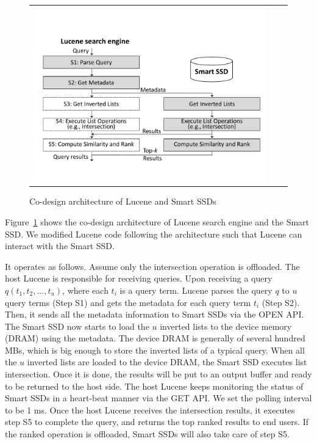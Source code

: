 \begin{figure}[htbp]
  \centering
  \begin{tabular}{ccc}
 \includegraphics[width=1.0\columnwidth]{figures/SmartSSDLucene.pdf}
\end{tabular}
  \caption{Co-design architecture of Lucene and Smart SSDs}
  \label{fig:SmartSSDLucene}
 \end{figure}

Figure~\ref{fig:SmartSSDLucene} shows the co-design architecture of Lucene search engine and the Smart SSD. We modified Lucene code following the architecture such that Lucene can interact with the Smart SSD.

It operates as follows. Assume only the \textsf{intersection} operation is offloaded. The host Lucene is responsible for receiving queries. Upon receiving a query $q(t_1,t_2,...,t_u)$, where each $t_i$ is a query term. Lucene parses the query $q$ to $u$ query terms (Step S1) and gets the metadata for each query term $t_i$ (Step S2). Then, it sends all the metadata information to Smart SSDs via the OPEN API.
The Smart SSD now starts to load the $u$ inverted lists to the device memory (DRAM) using the metadata. The device DRAM is generally of several hundred MBs, which is big enough to store the inverted lists of a typical query.
When all the $u$ inverted lists are loaded to the device DRAM, the Smart SSD executes list intersection. Once it is done, the results will be put to an output buffer and ready to be returned to the host side.
The host Lucene keeps monitoring the status of Smart SSDs in a heart-beat manner via the GET API. We set the polling interval to be 1 ms. Once the host Lucene receives the intersection results, it executes step S5 to complete the query, and returns the top ranked results to end users. If the ranked operation is offloaded, Smart SSDs will also take care of step S5.
